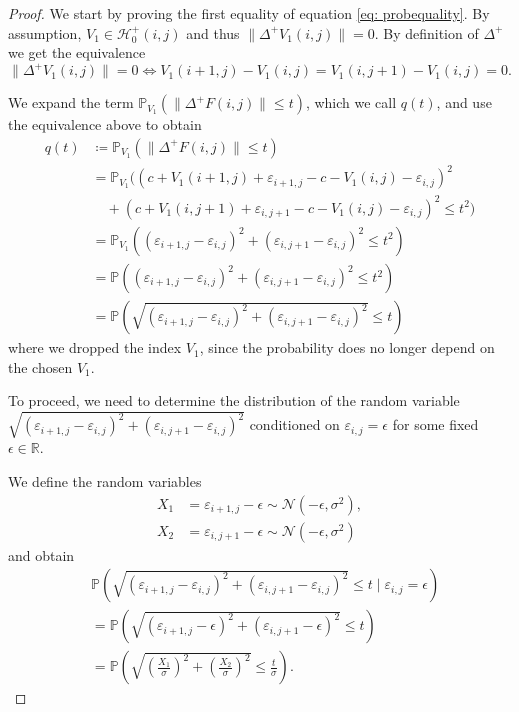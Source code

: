 \documentclass[a4paper,12pt]{article}
\newcommand{\norm}[1]{\lVert#1\rVert}
\theoremstyle{plain}
\theoremstyle{definition}
\numberwithin{equation}{section}
\begin{document}
\begin{proof}
	We start by proving the first equality of equation \eqref{eq: probequality}. By assumption, $V_1 \in \mathcal{H}_0^+(i, j)$ and thus $\norm{\Delta^+ V_1(i, j)} = 0$. By definition of $\Delta^+$ we get the equivalence
	\begin{equation*}
		\norm{\Delta^+ V_1(i, j)} = 0 \Leftrightarrow V_1(i + 1, j) - V_1(i, j) = V_1(i, j + 1) - V_1(i, j) = 0.
	\end{equation*}
	
	We expand the term $\mathbb{P}_{V_1}( \norm{\Delta^+ F(i, j)} \leq t )$, which we call $q(t)$, and use the equivalence above to obtain
	\begin{align*}
		q(t) &\coloneqq \mathbb{P}_{V_1}( \norm{\Delta^+ F(i, j)} \leq t ) \\
		&= \mathbb{P}_{V_1}\big( (c + V_1(i + 1, j) + \varepsilon_{i + 1, j} - c - V_1(i, j) - \varepsilon_{i, j})^2 \\
		&\quad + (c + V_1(i, j + 1) + \varepsilon_{i, j + 1} - c - V_1(i, j) - \varepsilon_{i, j})^2 \leq t^2 \big) \\
		&= \mathbb{P}_{V_1}\left( (\varepsilon_{i + 1, j} - \varepsilon_{i, j})^2 + (\varepsilon_{i, j + 1} - \varepsilon_{i, j})^2 \leq t^2 \right) \\
		&= \mathbb{P}\left( (\varepsilon_{i + 1, j} - \varepsilon_{i, j})^2 + (\varepsilon_{i, j + 1} - \varepsilon_{i, j})^2 \leq t^2 \right) \\
		&= \mathbb{P}\left( \sqrt{(\varepsilon_{i + 1, j} - \varepsilon_{i, j})^2 + (\varepsilon_{i, j + 1} - \varepsilon_{i, j})^2} \leq t \right)
	\end{align*}
	where we dropped the index $V_1$, since the probability does no longer depend on the chosen $V_1$.
	
	To proceed, we need to determine the distribution of the random variable $\sqrt{(\varepsilon_{i + 1, j} - \varepsilon_{i, j})^2 + (\varepsilon_{i, j + 1} - \varepsilon_{i, j})^2}$ conditioned on $\varepsilon_{i, j} = \epsilon$ for some fixed $\epsilon \in \mathbb{R}$.
	
	We define the random variables
	\begin{align*}
		X_1 &= \varepsilon_{i + 1, j} - \epsilon \sim \mathcal{N}(- \epsilon, \sigma^2), \\
		X_2 &= \varepsilon_{i, j + 1} - \epsilon \sim \mathcal{N}(- \epsilon, \sigma^2)
	\end{align*}
	and obtain
	\begin{align*}
		&\mathbb{P}\left( \sqrt{(\varepsilon_{i + 1, j} - \varepsilon_{i, j})^2 + (\varepsilon_{i, j + 1} - \varepsilon_{i, j})^2} \leq t \mid \varepsilon_{i, j} = \epsilon \right) \\
		&= \mathbb{P}\left( \sqrt{(\varepsilon_{i + 1, j} - \epsilon)^2 + (\varepsilon_{i, j + 1} - \epsilon)^2} \leq t \right) \\
		&= \mathbb{P}\left( \sqrt{\left( \frac{X_1}{\sigma} \right)^2 + \left( \frac{X_2}{\sigma} \right)^2} \leq \frac{t}{\sigma} \right).
	\end{align*}
	

\end{proof}
\end{document}
